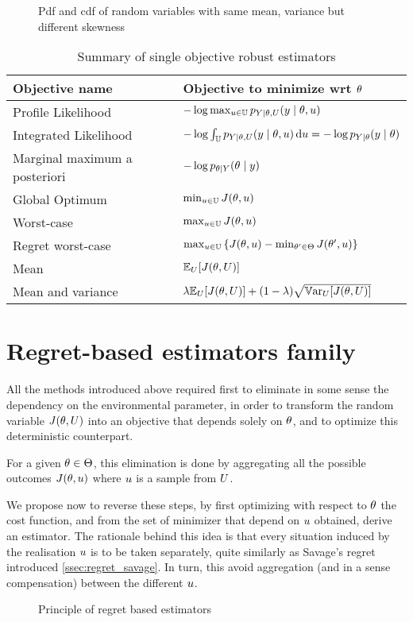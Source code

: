 \documentclass[../../Main_ManuscritThese.tex]{subfiles}
\newcommand\imgpath{/home/victor/acadwriting/Manuscrit/Text/Chapter3/img/}
\begin{document}
\begin{figure}[ht]
  \centering
  
  \caption{\label{fig:skewness_example} Pdf and cdf of random variables with same mean, variance but different skewness}
\end{figure}


\begin{table}[ht]
  \centering
  \begin{tabular}{ll}
    \toprule
    Objective name & Objective to minimize wrt $\theta$  \\ \midrule
    Profile Likelihood & $-\log \max_{u \in \mathbb{U}} p_{Y \mid \theta, U}(y \mid \theta, u)$  \\
    Integrated Likelihood & $-\log \int_{\mathbb{U}} p_{Y \mid \theta, U}(y \mid \theta, u) \,\mathrm{d}u=-\log p_{Y\mid \theta}(y\mid \theta)$ \\
    Marginal maximum a posteriori & $-\log p_{\theta\mid Y}(\theta \mid y)$  \\ \midrule
    Global Optimum & $\min_{u\in\mathbb{U}} J(\theta, u)$ \\
    Worst-case & $\max_{u \in \mathbb{U}} J(\theta, u)$ \\
    Regret worst-case & $\max_{u\in\mathbb{U}}\left\{J(\theta, u) - \min_{\theta^{\prime}\in\Theta} J(\theta^{\prime}, u)\right\}$ \\ \midrule
    Mean & $\mathbb{E}_{U}[J(\theta, U)]$  \\
    Mean and variance & $ \lambda \mathbb{E}_{U}[J(\theta, U)] + (1-\lambda) \sqrt{\mathbb{V}\mathrm{ar}_{U}[J(\theta, U)]}$  \\ \bottomrule
  \end{tabular}
  \caption{Summary of single objective robust estimators}
\end{table}

\section{Regret-based estimators family}
\label{sec:rr_family}
All the methods introduced above required first to eliminate in some sense the dependency on the environmental parameter, in order to transform the random variable $J(\theta, U)$ into an objective that depends solely on $\theta$, and to optimize this deterministic counterpart.

For a given $\theta\in\Theta$, this elimination is done by aggregating all the possible outcomes $J(\theta, u)$ where $u$ is a sample from $U$.


We propose now to reverse these steps, by first optimizing with respect to $\theta$ the cost function, and from the set of minimizer that depend on $u$ obtained, derive an estimator. The rationale behind this idea is that every situation induced by the realisation $u$ is to be taken separately, quite similarly as Savage's regret introduced \cref{ssec:regret_savage}. In turn, this avoid aggregation (and in a sense compensation) between the different $u$.
\begin{figure}[ht]
  \centering
  
  \caption{\label{fig:reversing_steps} Principle of regret based estimators}
\end{figure}
\end{document}
